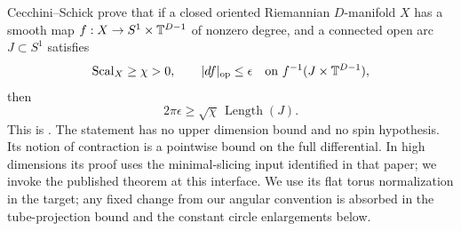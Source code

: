 Cecchini--Schick prove that if a closed oriented Riemannian $D$-manifold $X$
has a smooth map $f:X\to S^1\times\mathbb T^{D-1}$ of nonzero degree, and a
connected open arc $J\subset S^1$ satisfies
\[
 \operatorname{Scal}_X\ge\chi>0,\qquad |df|_{\mathrm{op}}\le\epsilon
 \quad\text{on }f^{-1}(J\times\mathbb T^{D-1}),
\]
then
\begin{equation}\label{eq:cecchini-schick}
 2\pi\epsilon\ge\sqrt\chi\,\operatorname{Length}(J).
\end{equation}
This is \cite[Theorem~1.14(1)]{CecchiniSchick2021}. The statement has no
upper dimension bound and no spin hypothesis. Its notion of contraction is
a pointwise bound on the full differential. In high dimensions its proof uses the
minimal-slicing input identified in that paper; we invoke the
published theorem at this interface. We use its flat torus normalization
in the target; any fixed change from our angular convention is absorbed
in the tube-projection bound and the constant circle enlargements below.


